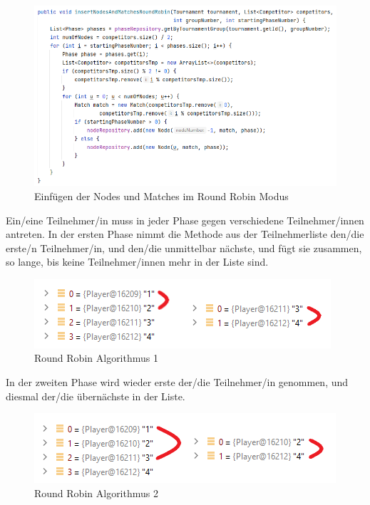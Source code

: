 \begin{figure}[H]
    \includegraphics[scale=0.6]{pics/backend/roundrobin/roundrobin_insertNodesAndMatches.png}
    \caption{Einfügen der Nodes und Matches im Round Robin Modus}
\end{figure}

Ein/eine Teilnehmer/in muss in jeder Phase gegen verschiedene Teilnehmer/innen antreten. In der ersten Phase nimmt die Methode aus der Teilnehmerliste den/die erste/n Teilnehmer/in, und den/die unmittelbar nächste, und fügt sie zusammen, 
so lange, bis keine Teilnehmer/innen mehr in der Liste sind. 

\begin{figure}[H]
    \includegraphics[scale=0.8]{pics/backend/roundrobin/matching_up_1.png}
    \caption{Round Robin Algorithmus 1}
\end{figure}

In der zweiten Phase wird wieder erste der/die Teilnehmer/in genommen, und diesmal der/die übernächste in der Liste. 

\begin{figure}[H]
    \includegraphics[scale=0.8]{pics/backend/roundrobin/matching_up_2.png}
    \caption{Round Robin Algorithmus 2}
\end{figure}

